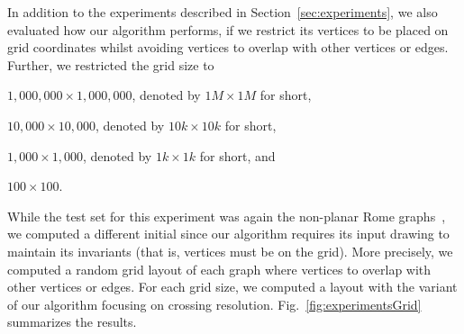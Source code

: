 \documentclass[runningheads]{llncs}
\begin{document}
In addition to the experiments described in Section~\ref{sec:experiments}, we also evaluated how our algorithm performs, if we restrict its vertices to be placed on grid coordinates whilst avoiding vertices to overlap with other vertices or edges. Further, we restricted the grid size to \begin{inparaenum}[(i)]
\item $1,000,000 \times 1,000,000$, denoted by $1M \times 1M$ for short,
\item $10,000 \times 10,000$, denoted by $10k \times 10k$ for short,
\item $1,000 \times 1,000$, denoted by $1k \times 1k$ for short, and
\item $100 \times 100$.

\end{inparaenum}
While the test set for this experiment was again the non-planar Rome graphs~\cite{DBLP:reference/crc/BattistaD13}, we computed a different initial since our algorithm requires its input drawing to maintain its invariants (that is, vertices must be on the grid). More precisely, we computed a random grid layout of each graph where vertices to overlap with other vertices or edges. For each grid size, we computed a layout with the variant of our algorithm focusing on crossing resolution. Fig.~\ref{fig:experimentsGrid} summarizes the results.
\end{document}
